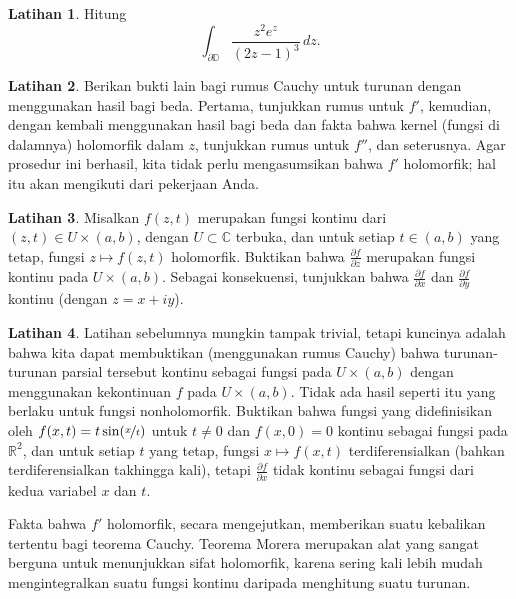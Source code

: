\documentclass[12pt,openany]{book}
\newcommand{\C}{{\mathbb{C}}}
\newcommand{\R}{{\mathbb{R}}}
\newcommand{\D}{{\mathbb{D}}}
\theoremstyle{plain}
\theoremstyle{remark}
\theoremstyle{definition}
\newenvironment{exbox}{%
    \def\FrameCommand{\vrule width 1pt \relax\hspace{10pt}}%
    \MakeFramed{\advance\hsize-\width\FrameRestore}%
}{%
    \endMakeFramed
}
\theoremstyle{exercise}
\newtheorem{exercise}{Latihan}[section]
\theoremstyle{example}
\begin{document}
\begin{exbox}
\begin{exercise}
Hitung
\begin{equation*}
\int_{\partial \D}
\frac{z^2 e^z}{(2z-1)^3} \, dz .
\end{equation*}
\end{exercise}

\begin{exercise}
Berikan bukti lain bagi rumus Cauchy untuk turunan dengan menggunakan hasil bagi
beda.  Pertama, tunjukkan rumus untuk $f'$, kemudian, dengan kembali menggunakan hasil bagi
beda dan fakta bahwa kernel (fungsi di dalamnya) holomorfik
dalam $z$, tunjukkan rumus untuk $f''$, dan seterusnya.  Agar prosedur ini berhasil,
kita tidak perlu mengasumsikan bahwa $f'$ holomorfik; hal itu akan mengikuti dari
pekerjaan Anda.
\end{exercise}

\begin{exercise}%
\label{exercise:partialderscont}
Misalkan $f(z,t)$ merupakan fungsi kontinu dari $(z,t) \in U \times (a,b)$,
dengan $U \subset \C$ terbuka, dan untuk setiap $t \in (a,b)$ yang tetap, fungsi
$z \mapsto f(z,t)$ holomorfik.  Buktikan bahwa
$\frac{\partial f}{\partial z}$ merupakan fungsi kontinu pada $U \times
(a,b)$.  Sebagai konsekuensi, tunjukkan bahwa
$\frac{\partial f}{\partial x}$
dan
$\frac{\partial f}{\partial y}$ kontinu (dengan $z=x+iy$).
\end{exercise}

\begin{exercise}
Latihan sebelumnya mungkin tampak trivial, tetapi kuncinya adalah bahwa kita dapat membuktikan
(menggunakan rumus Cauchy) bahwa turunan-turunan parsial tersebut kontinu sebagai fungsi pada
$U \times (a,b)$ dengan menggunakan kekontinuan $f$ pada $U \times (a,b)$.  Tidak ada hasil seperti itu
yang berlaku untuk fungsi nonholomorfik.  Buktikan bahwa fungsi yang didefinisikan oleh
$f(x,t) = t \sin(\nicefrac{x}{t})$ untuk $t \neq 0$ dan $f(x,0) =  0$
kontinu sebagai fungsi pada $\R^2$, dan untuk setiap $t$ yang tetap, fungsi
$x \mapsto f(x,t)$ terdiferensialkan (bahkan terdiferensialkan takhingga kali),
tetapi $\frac{\partial f}{\partial x}$ tidak kontinu sebagai fungsi dari kedua variabel
$x$ dan $t$.
\end{exercise}
\end{exbox}

Fakta bahwa $f'$ holomorfik, secara mengejutkan, memberikan suatu
kebalikan tertentu bagi teorema Cauchy.
Teorema Morera merupakan alat yang sangat berguna untuk menunjukkan
sifat holomorfik, karena sering kali lebih mudah mengintegralkan suatu fungsi
kontinu daripada menghitung suatu turunan.
\end{document}
